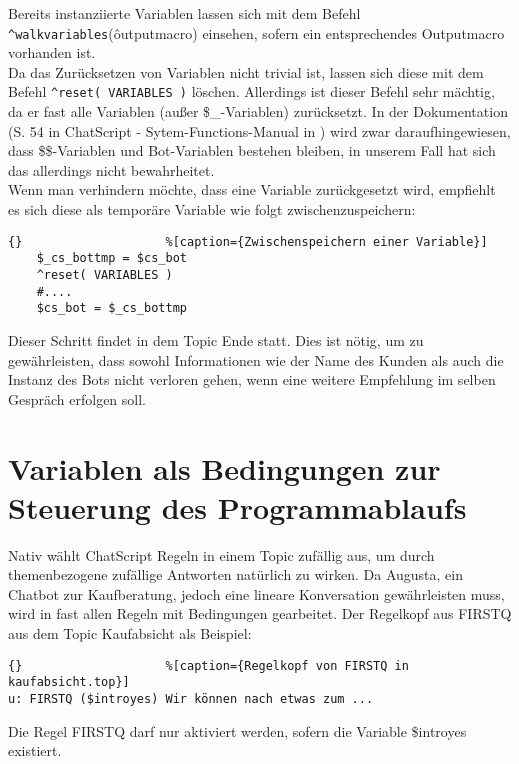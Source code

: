 Bereits instanziierte Variablen lassen sich mit dem Befehl \lstinline|^walkvariables|(\^outputmacro) einsehen, sofern ein entsprechendes Outputmacro vorhanden ist.\\
Da das Zurücksetzen von Variablen nicht trivial ist, lassen sich diese mit dem Befehl \lstinline|^reset( VARIABLES )| löschen. Allerdings ist dieser Befehl sehr mächtig, da er fast alle Variablen (außer \$\_-Variablen) zurücksetzt. In der Dokumentation (S. 54 in ChatScript - Sytem-Functions-Manual in \citet{chatscript2019}) wird zwar daraufhingewiesen, dass \$\$-Variablen und Bot-Variablen bestehen bleiben, in unserem Fall hat sich das allerdings nicht bewahrheitet.\\
Wenn man verhindern möchte, dass eine Variable zurückgesetzt wird, empfiehlt es sich diese als temporäre Variable wie folgt zwischenzuspeichern:

\begin{lstlisting}{}					%[caption={Zwischenspeichern einer Variable}]
	$_cs_bottmp = $cs_bot
    ^reset( VARIABLES )
    #....
	$cs_bot = $_cs_bottmp 
\end{lstlisting}

Dieser Schritt findet in dem Topic Ende statt. Dies ist nötig, um zu gewährleisten, dass sowohl Informationen wie der Name des Kunden als auch die Instanz des Bots nicht verloren gehen, wenn eine weitere Empfehlung im selben Gespräch erfolgen soll.\\


\section{Variablen als Bedingungen zur Steuerung des Programmablaufs}
\label{sec:ChatScript: Variablen als Bedingungen zur Steuerung von Programmablauf}

Nativ wählt ChatScript Regeln in einem Topic zufällig aus, um durch themenbezogene zufällige Antworten natürlich zu wirken. Da Augusta, ein Chatbot zur Kaufberatung, jedoch eine lineare Konversation gewährleisten muss, wird in fast allen Regeln mit Bedingungen gearbeitet. Der Regelkopf aus FIRSTQ aus dem Topic Kaufabsicht als Beispiel: 

\begin{lstlisting}{}					%[caption={Regelkopf von FIRSTQ in kaufabsicht.top}]
u: FIRSTQ ($introyes) Wir können nach etwas zum ... 
\end{lstlisting}

Die Regel FIRSTQ darf nur aktiviert werden, sofern die Variable \$introyes existiert. 

